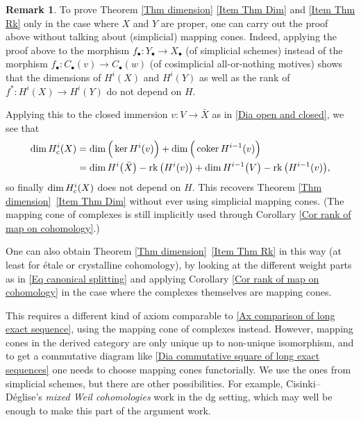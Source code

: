 \documentclass[11pt]{amsart}
\theoremstyle{definition}
\newtheorem{Rmk}[Thm]{Remark}
\newcommand{\cs}{_{\text{\normalfont c}}}
\newcommand{\rk}{\operatorname{rk}}
\newcommand{\coker}{\operatorname{coker}}
\begin{document}
\begin{Rmk}\label{Rmk WZ}
To prove Theorem \ref{Thm dimension} \ref{Item Thm Dim} and
\ref{Item Thm Rk} only in the case where $X$ and $Y$ are proper, one
can carry out the proof above without talking about (simplicial)
mapping cones. Indeed, applying the proof above to the morphism
$f_\bullet \colon Y_\bullet \to X_\bullet$ (of simplicial schemes)
instead of the morphism $f_\bullet \colon C_\bullet(v) \to
C_\bullet(w)$ (of cosimplicial all-or-nothing motives) shows that
the dimensions of $H^i(X)$ and $H^i(Y)$ as well as the rank of $f^*
\colon H^i(X) \to H^i(Y)$ do not depend on $H$.

Applying this to the closed immersion $v \colon V \to \bar X$ as in
\eqref{Dia open and closed}, we see that
\begin{align*}
\dim H^i\cs(X) &= \dim\Big(\ker H^i(v)\Big) + \dim\Big(\coker H^{i-1}(v)\Big) \\
&= \dim H^i\big(\bar X\big) - \rk\big(H^i(v)\big) + \dim
H^{i-1}\big(V\big) - \rk\big(H^{i-1}(v)\big),
\end{align*}
so finally $\dim H^i\cs(X)$ does not depend on $H$. This recovers
Theorem \ref{Thm dimension}~\ref{Item Thm Dim} without ever using
simplicial mapping cones. (The mapping cone of complexes is still
implicitly used through Corollary \ref{Cor rank of map on
cohomology}.)

One can also obtain Theorem \ref{Thm dimension}~\ref{Item Thm Rk} in
this way (at least for \'etale or crystalline cohomology), by
looking at the different weight parts as in \eqref{Eq canonical
splitting} and applying Corollary \ref{Cor rank of map on
cohomology} in the case where the complexes themselves are mapping
cones.

This requires a different kind of axiom comparable to \ref{Ax
comparison of long exact sequence}, using the mapping cone of
complexes instead. However, mapping cones in the derived category
are only unique up to non-unique isomorphism, and to get a
commutative diagram like \eqref{Dia commutative square of long exact
sequences} one needs to choose mapping cones functorially. We use
the ones from simplicial schemes, but there are other possibilities.
For example, Cisinki--D\'eglise's \emph{mixed Weil cohomologies}
\cite{CisDeg1} work in the dg setting, which may well be enough to
make this part of the argument work.
\end{Rmk}
\end{document}

